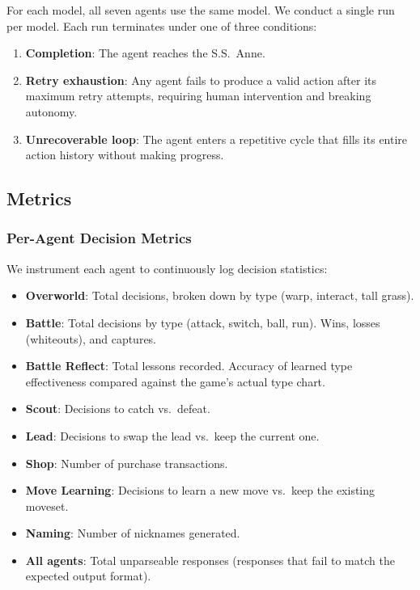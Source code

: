 \documentclass{article}
\begin{document}
For each model, all seven agents use the same model. We conduct a single run per model. Each run terminates under one of three conditions:

\begin{enumerate}
  \item \textbf{Completion}: The agent reaches the S.S.\ Anne.
  \item \textbf{Retry exhaustion}: Any agent fails to produce a valid action after its maximum retry attempts, requiring human intervention and breaking autonomy.
  \item \textbf{Unrecoverable loop}: The agent enters a repetitive cycle that fills its entire action history without making progress.
\end{enumerate}

\subsection{Metrics}

\subsubsection{Per-Agent Decision Metrics}

We instrument each agent to continuously log decision statistics:

\begin{itemize}
  \item \textbf{Overworld}: Total decisions, broken down by type (warp, interact, tall grass).
  \item \textbf{Battle}: Total decisions by type (attack, switch, ball, run). Wins, losses (whiteouts), and captures.
  \item \textbf{Battle Reflect}: Total lessons recorded. Accuracy of learned type effectiveness compared against the game's actual type chart.
  \item \textbf{Scout}: Decisions to catch vs.\ defeat.
  \item \textbf{Lead}: Decisions to swap the lead vs.\ keep the current one.
  \item \textbf{Shop}: Number of purchase transactions.
  \item \textbf{Move Learning}: Decisions to learn a new move vs.\ keep the existing moveset.
  \item \textbf{Naming}: Number of nicknames generated.
  \item \textbf{All agents}: Total unparseable responses (responses that fail to match the expected output format).
\end{itemize}
\end{document}
